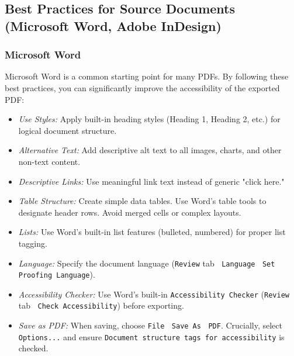 \subsection{Best Practices for Source Documents (Microsoft Word, Adobe InDesign)}
\label{subsec:best-practices-source}
\subsubsection{Microsoft Word}
\label{subsubsec:word}
Microsoft Word is a common starting point for many PDFs. By following these best practices, you can significantly improve the accessibility of the exported PDF:
\begin{itemize}
\item \emph{Use Styles:} Apply built-in heading styles (Heading 1, Heading 2, etc.) for logical document structure.\cite{MSWordPDF}
\item \emph{Alternative Text:} Add descriptive alt text to all images, charts, and other non-text content.
\item \emph{Descriptive Links:} Use meaningful link text instead of generic "click here."
\item \emph{Table Structure:} Create simple data tables. Use Word's table tools to designate header rows. Avoid merged cells or complex layouts.
\item \emph{Lists:} Use Word's built-in list features (bulleted, numbered) for proper list tagging.
\item \emph{Language:} Specify the document language (\texttt{Review} tab $\>$ \texttt{Language} $\>$ \texttt{Set Proofing Language}).
\item \emph{Accessibility Checker:} Use Word's built-in \texttt{Accessibility Checker} (\texttt{Review} tab $\>$ \texttt{Check Accessibility}) before exporting.
\item \emph{Save as PDF:} When saving, choose \texttt{File} $\>$ \texttt{Save As} $\>$ \texttt{PDF}. Crucially, select \texttt{Options...} and ensure \texttt{Document structure tags for accessibility} is checked.
\end{itemize}

